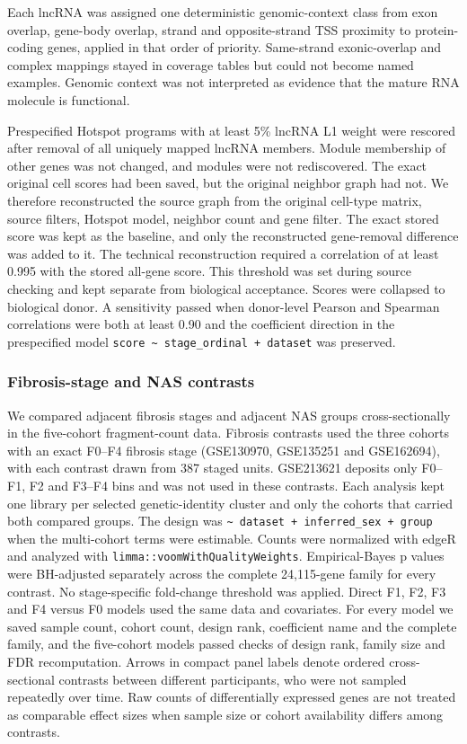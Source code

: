 Each lncRNA was assigned one deterministic genomic-context class from exon overlap, gene-body overlap, strand and opposite-strand TSS proximity to protein-coding genes, applied in that order of priority. Same-strand exonic-overlap and complex mappings stayed in coverage tables but could not become named examples. Genomic context was not interpreted as evidence that the mature RNA molecule is functional.

Prespecified Hotspot programs with at least 5\% lncRNA L1 weight were rescored after removal of all uniquely mapped lncRNA members. Module membership of other genes was not changed, and modules were not rediscovered. The exact original cell scores had been saved, but the original neighbor graph had not. We therefore reconstructed the source graph from the original cell-type matrix, source filters, Hotspot model, neighbor count and gene filter. The exact stored score was kept as the baseline, and only the reconstructed gene-removal difference was added to it. The technical reconstruction required a correlation of at least 0.995 with the stored all-gene score. This threshold was set during source checking and kept separate from biological acceptance. Scores were collapsed to biological donor. A sensitivity passed when donor-level Pearson and Spearman correlations were both at least 0.90 and the coefficient direction in the prespecified model \texttt{score\ \textasciitilde{}\ stage\_\allowbreak{}ordinal\ +\ dataset} was preserved.

\subsubsection{Fibrosis-stage and NAS contrasts}\label{fibrosis-stage-and-nas-contrasts}

We compared adjacent fibrosis stages and adjacent NAS groups cross-sectionally in the five-cohort fragment-count data. Fibrosis contrasts used the three cohorts with an exact F0--F4 fibrosis stage (GSE130970, GSE135251 and GSE162694), with each contrast drawn from 387 staged units. GSE213621 deposits only F0--F1, F2 and F3--F4 bins and was not used in these contrasts. Each analysis kept one library per selected genetic-identity cluster and only the cohorts that carried both compared groups. The design was \texttt{\textasciitilde{}\ dataset\ +\ inferred\_\allowbreak{}sex\ +\ group} when the multi-cohort terms were estimable. Counts were normalized with edgeR and analyzed with \texttt{limma::voomWithQualityWeights}. Empirical-Bayes p values were BH-adjusted separately across the complete 24,115-gene family for every contrast. No stage-specific fold-change threshold was applied. Direct F1, F2, F3 and F4 versus F0 models used the same data and covariates. For every model we saved sample count, cohort count, design rank, coefficient name and the complete family, and the five-cohort models passed checks of design rank, family size and FDR recomputation. Arrows in compact panel labels denote ordered cross-sectional contrasts between different participants, who were not sampled repeatedly over time. Raw counts of differentially expressed genes are not treated as comparable effect sizes when sample size or cohort availability differs among contrasts.

